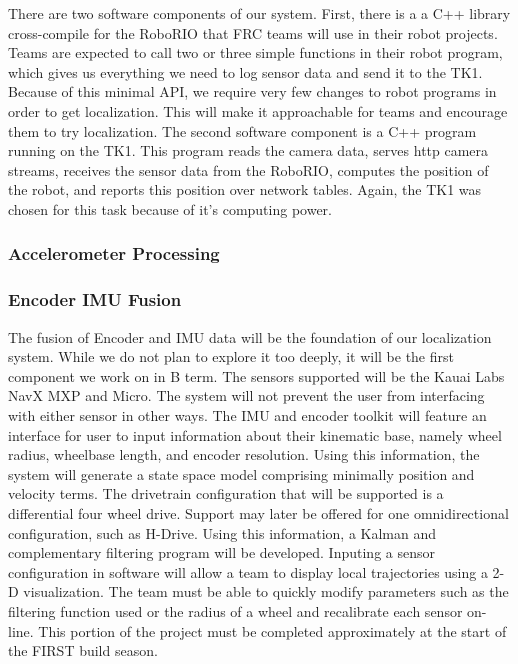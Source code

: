 \documentclass{article}
\begin{document}
			There are two software components of our system. First, there is a a C++ library cross-compile for the RoboRIO that FRC teams will use in their robot projects. Teams are expected to call two or three simple functions in their robot program, which gives us everything we need to log sensor data and send it to the TK1. Because of this minimal API, we require very few changes to robot programs in order to get localization. This will make it approachable for teams and encourage them to try localization. The second software component is a C++ program running on the TK1. This program reads the camera data, serves http camera streams, receives the sensor data from the RoboRIO, computes the position of the robot, and reports this position over network tables. Again, the TK1 was chosen for this task because of it's computing power.

    \subsubsection{Accelerometer Processing}


    \subsubsection{Encoder IMU Fusion}

      The fusion of Encoder and IMU data will be the foundation of our localization system. While we do not plan to explore it too deeply, it will be the first component we work on in B term. The sensors supported will be the Kauai Labs NavX MXP and Micro. The system will not prevent the user from interfacing with either sensor in other ways. The IMU and encoder toolkit will feature an interface for user to input information about their kinematic base, namely wheel radius, wheelbase length, and encoder resolution. Using this information, the system will generate a state space model comprising minimally position and velocity terms. The drivetrain configuration that will be supported is a differential four wheel drive. Support may later be offered for one omnidirectional configuration, such as H-Drive. Using this information, a Kalman and complementary filtering program will be developed. Inputing a sensor configuration in software will allow a team to display local trajectories using a 2-D visualization. The team must be able to quickly modify parameters such as the filtering function used or the radius of a wheel and recalibrate each sensor on-line. This portion of the project must be completed approximately at the start of the FIRST build season.
\end{document}
